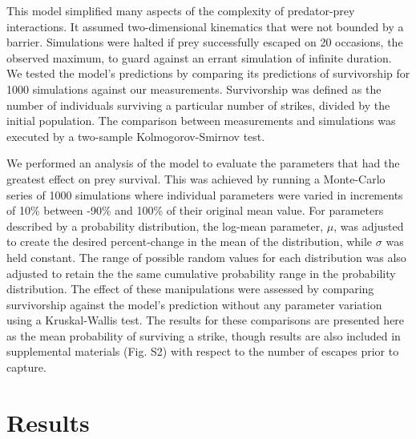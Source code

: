 \documentclass[]{rsos}%
\begin{document}
This model simplified many aspects of the complexity of predator-prey interactions.
It assumed two-dimensional kinematics that were not bounded by a barrier. 
Simulations were halted if prey successfully escaped on 20 occasions, the observed maximum, to guard against an errant simulation of infinite duration.
We tested the model's predictions by comparing its predictions of survivorship for 1000 simulations against our measurements.
Survivorship was defined as the number of individuals surviving a particular number of strikes, divided by the initial population.
The comparison between measurements and simulations was executed by a two-sample Kolmogorov-Smirnov test.  

We performed an analysis of the model to evaluate the parameters that had the greatest effect on prey survival. 
This was achieved by running a Monte-Carlo series of 1000 simulations where individual parameters were varied in increments of 10\% between -90\% and 100\% of their original mean value.
For parameters described by a probability distribution, the log-mean parameter, $\mu$, was adjusted to create the desired percent-change in the mean of the distribution, while $\sigma$ was held constant.
The range of possible random values for each distribution was also adjusted to retain the the same cumulative probability range in the probability distribution.
The effect of these manipulations were assessed by comparing survivorship against the model's prediction without any parameter variation using a Kruskal-Wallis test. 
The results for these comparisons are presented here as the mean probability of surviving a strike, though results are also included in supplemental materials (Fig. S2) with respect to the number of escapes prior to capture.


\section{Results} %
\end{document}
